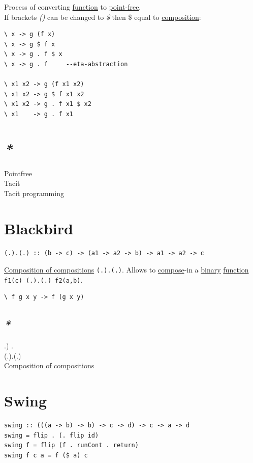 \documentclass[a4paper,14pt,oneside]{book}
\begin{document}
Process of converting \hyperref[org9530a6b]{function} to \hyperref[orgf055eb0]{point-free}.\\
If brackets \emph{()} can be changed to \emph{\$} then \$ equal to \hyperref[org309d77e]{composition}:\\
\begin{verbatim}
\ x -> g (f x)
\ x -> g $ f x
\ x -> g . f $ x
\ x -> g . f     --eta-abstraction

\ x1 x2 -> g (f x1 x2)
\ x1 x2 -> g $ f x1 x2
\ x1 x2 -> g . f x1 $ x2
\ x1    -> g . f x1
\end{verbatim}

\section{\emph{*}}
\label{sec:org5745adb}

\label{org578fffb}Pointfree\\
\label{org3386edb}Tacit\\
\label{org5628ae5}Tacit programming\\

\section{\label{org40e5418}Blackbird}
\label{sec:org95dfc44}
\begin{verbatim}
(.).(.) :: (b -> c) -> (a1 -> a2 -> b) -> a1 -> a2 -> c
\end{verbatim}

\hyperref[orgc41a419]{Composition of compositions} \texttt{(.).(.)}. Allows to \hyperref[orge7c5c9b]{compose}-in a \hyperref[orga442c45]{binary} \hyperref[org9530a6b]{function} \texttt{f1(c) (.).(.) f2(a,b)}.\\
\begin{verbatim}
\ f g x y -> f (g x y)
\end{verbatim}

\subsection{\emph{*}}
\label{sec:org7de230d}

\label{org6021d8f}.) .\\
\label{orgd1df2cc}(.).(.)\\
\label{orgc41a419}Composition of compositions\\

\section{\label{orgc914253}Swing}
\label{sec:orgd47d271}
\begin{verbatim}
swing :: (((a -> b) -> b) -> c -> d) -> c -> a -> d
swing = flip . (. flip id)
swing f = flip (f . runCont . return)
swing f c a = f ($ a) c
\end{verbatim}
\end{document}
